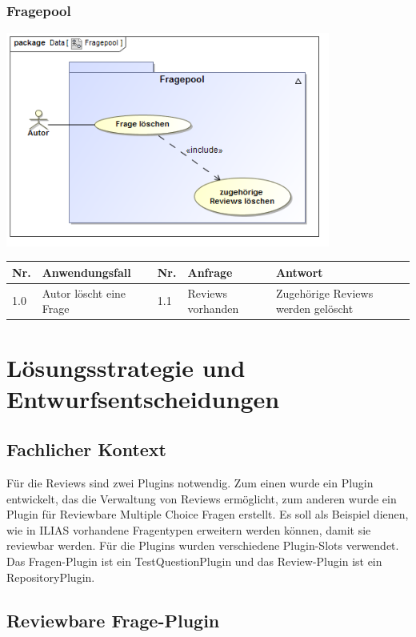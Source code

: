 \documentclass[a4paper]{scrreprt}
\begin{document}
\newpage

\subsection{Fragepool}

\includegraphics[width=0.8\textwidth]{Use_Case_Diagram__Fragepool.png}
\label{Fragepool bearbeiten}

\begin{tabular}{|p{0.5cm}|p{3cm}|p{0.5cm}|p{4cm}|p{4.5cm}|}\hline
Nr. & Anwendungsfall & Nr. & Anfrage & Antwort\\\hline
1.0 & Autor löscht eine Frage & 1.1 & Reviews vorhanden & Zugehörige Reviews werden gelöscht\\\hline
\end{tabular}

\chapter{Lösungsstrategie und Entwurfsentscheidungen}

\section{Fachlicher Kontext}

Für die Reviews sind zwei Plugins notwendig. 
Zum einen wurde ein Plugin entwickelt, das die Verwaltung von Reviews ermöglicht, zum anderen wurde ein Plugin für Reviewbare Multiple Choice Fragen erstellt. 
Es soll als Beispiel dienen, wie in ILIAS vorhandene Fragentypen erweitern werden können, damit sie reviewbar werden.
Für die Plugins wurden verschiedene Plugin-Slots verwendet. 
Das Fragen-Plugin ist ein TestQuestionPlugin und das Review-Plugin ist ein RepositoryPlugin.\\ 

\section{Reviewbare Frage-Plugin}
\end{document}
